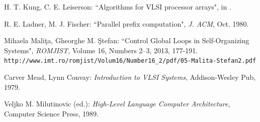 {\begin{thebibliography}{}
 H. T. Kung, C. E. Leiserson: ``Algorithms for VLSI processor arrays", in \cite{Mead}.

 R. E. Ladner, M. J. Fischer: ``Parallel prefix computation", {\em J. ACM}, Oct. 1980.




 Mihaela Mali\c ta, Gheorghe M. \c Stefan: ``Control Global Loops in Self-Organizing Systems", {\em ROMJIST}, Volume 16, Numbers 2–3, 2013, 177-191. \\ {\tt http://www.imt.ro/romjist/Volum16/Number16\_2/pdf/05-Malita-Stefan2.pdf}


 Carver Mead, Lynn Convay: {\em Introduction to VLSI Systems}, Addison-Wesley Pub, 1979.


 Veljko M. Milutinovic (ed.): {\em High-Level Language Computer Architecture}, Computer Science Press, 1989.




\end{thebibliography}}
